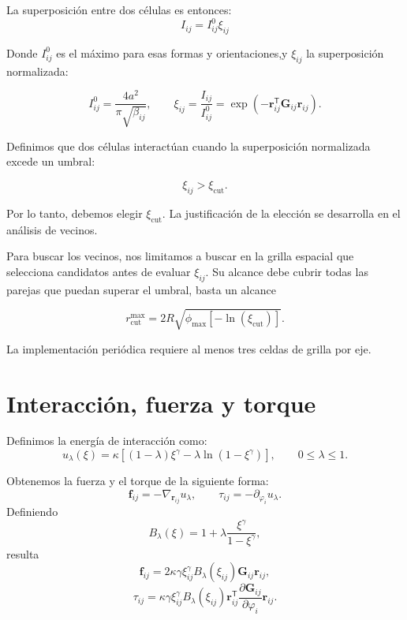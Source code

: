 \documentclass[11pt,a4paper]{article}
\begin{document}
La superposición entre dos células es entonces:
\begin{equation}
	I_{ij}=I_{ij}^{0}\xi_{ij}
\end{equation}

Donde $I_{ij}^{0}$ es el máximo para esas formas y orientaciones,y $\xi_{ij}$ la superposición normalizada:

\begin{equation}
 I_{ij}^{0}=\frac{4a^2}{\pi\sqrt{\beta_{ij}}},\qquad
 \xi_{ij}=\frac{I_{ij}}{I_{ij}^{0}}
 =\exp(-\bm r_{ij}^{\mathsf T}\bm G_{ij}\bm r_{ij}).
\end{equation}

Definimos que dos células interactúan cuando la superposición normalizada excede un umbral:

\begin{equation}
 \boxed{\xi_{ij}>\xi_{\mathrm{cut}}.}
\end{equation}

Por lo tanto, debemos elegir $\xi_{\mathrm{cut}}$. La justificación de la elección se desarrolla en el análisis de vecinos.

Para buscar los vecinos, nos limitamos a buscar en la grilla espacial que selecciona candidatos antes de evaluar $\xi_{ij}$. Su alcance debe cubrir todas las parejas que puedan superar el umbral, basta un alcance

\begin{equation}
 r_{\mathrm{cut}}^{\max}
 =2R\sqrt{\phi_{\max}[-\ln(\xi_{\mathrm{cut}})]}.
\end{equation}

La implementación periódica
requiere al menos tres celdas de grilla por eje.

\section{Interacción, fuerza y torque}

Definimos la energía de interacción como:
\begin{equation}
 u_\lambda(\xi)=\kappa\left[(1-\lambda)\xi^\gamma
 -\lambda\ln(1-\xi^\gamma)\right],\qquad 0\leq\lambda\leq1.
\end{equation}

Obtenemos la fuerza y el torque de la siguiente forma:
\begin{equation}
 \bm f_{ij}=-\nabla_{\bm r_{ij}}u_\lambda,\qquad
 \tau_{ij}=-\partial_{\varphi_i}u_\lambda.
\end{equation}
Definiendo
\begin{equation}
 B_\lambda(\xi)=1+\lambda\frac{\xi^\gamma}{1-\xi^\gamma},
\end{equation}
resulta
\begin{equation}
 \bm f_{ij}=2\kappa\gamma\xi_{ij}^{\gamma}B_\lambda(\xi_{ij})
 \bm G_{ij}\bm r_{ij},
\end{equation}
\begin{equation}
 \tau_{ij}=\kappa\gamma\xi_{ij}^{\gamma}B_\lambda(\xi_{ij})\bm r_{ij}^{\mathsf T} \frac{\partial\bm G_{ij}}{\partial\varphi_i}\bm r_{ij}.
\end{equation}
\end{document}
